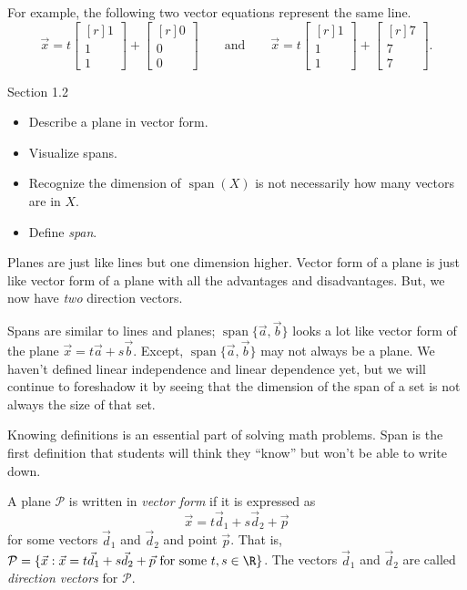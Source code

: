 \documentclass{problemset}
\DeclareMathOperator{\Span}{span}
\newcommand{\mat}[1]{\begin{bmatrix*}[r]#1\end{bmatrix*}}
\begin{document}
\begin{parts}
\begin{solution}
				For example, the following two vector equations represent the 
				same line.
				\[
					\vec x = t \mat{1\\1\\1} + \mat{0\\0\\0} 
					\qquad \text{and} \qquad
					\vec x = t \mat{1\\1\\1} + \mat{7\\7\\7}.
				\]
			\end{solution}
	\end{parts}
	

\begin{lesson}
	\newpage

	Section 1.2

	\begin{itemize}
		\item Describe a plane in vector form.
		\item Visualize spans.
		\item Recognize the dimension of $\Span(X)$ is not necessarily how many vectors
			are in $X$.
		\item Define \emph{span}.
	\end{itemize}

	Planes are just like lines but one dimension higher. Vector form of a plane is just like
	vector form of a plane with all the advantages and disadvantages. But, we now have
	\emph{two} direction vectors.

	Spans are similar to lines and planes; $\Span\{\vec a,\vec b\}$ looks a lot like
	vector form of the plane
	$\vec x=t\vec a+s\vec b$. Except, $\Span\{\vec a,\vec b\}$ may not always be a plane.
	We haven't defined linear independence and linear dependence yet, but we will continue to
	foreshadow it by seeing that the dimension of the span of a set is not always the size of
	that set.

	Knowing definitions is an essential part of solving math problems. Span is
	the first definition that students will think they ``know'' but won't be
	able to write down.

	\newpage
\end{lesson}

	\begin{definition}
		A plane $\mathcal P$ is written in \emph{vector form} if it is expressed
		as
		\[
			\vec x=t\vec d_1 +s\vec d_2+\vec p
		\]
		for some vectors $\vec d_1$ and $\vec d_2$ and 
		point $\vec p$. That is, $\mathcal P = \{\vec x: \vec x=
		t\vec d_1+s\vec d_2 +\vec p\text{ for some } t,s\in\R \}$. The vectors 
		$\vec d_1$ and $\vec d_2$ are called \emph{direction
		vectors} for $\mathcal P$.
	\end{definition}
\end{document}
